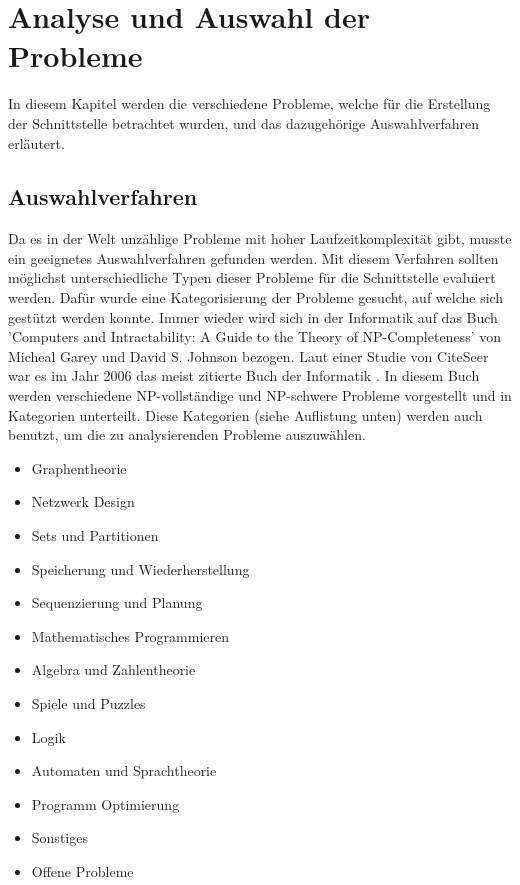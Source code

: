%
%

\chapter{Analyse und Auswahl der Probleme \resultAssignment{[R1]}}\label{chap.problemauswahl}
In diesem Kapitel werden die verschiedene Probleme, welche für die Erstellung der Schnittstelle betrachtet wurden, und das dazugehörige Auswahlverfahren erläutert.

\section{Auswahlverfahren}\label{cat_theo_inf}
Da es in der Welt unzählige Probleme mit hoher Laufzeitkomplexität gibt, musste ein geeignetes Auswahlverfahren gefunden werden. Mit diesem Verfahren sollten möglichst unterschiedliche 
Typen dieser Probleme für die Schnittstelle evaluiert werden. Dafür wurde eine Kategorisierung der Probleme gesucht, auf welche sich gestützt werden konnte. Immer wieder wird sich in der 
Informatik auf das Buch 'Computers and Intractability: A Guide to the Theory of NP-Completeness' \cite{garey1979computers} von Micheal Garey und David S. Johnson bezogen. Laut einer 
Studie von CiteSeer war es im Jahr 2006 das meist zitierte Buch der Informatik \cite{citeseer_algo_buch}. In diesem Buch werden verschiedene NP-vollständige und NP-schwere 
Probleme vorgestellt und in Kategorien unterteilt. Diese Kategorien (siehe Auflistung unten) werden auch benutzt, um die zu analysierenden Probleme auszuwählen.

\begin{itemize}
	\item Graphentheorie
	\item Netzwerk Design
	\item Sets und Partitionen
	\item Speicherung und Wiederherstellung
	\item Sequenzierung und Planung
	\item Mathematisches Programmieren
	\item Algebra und Zahlentheorie
	\item Spiele und Puzzles
	\item Logik
	\item Automaten und Sprachtheorie
	\item Programm Optimierung
	\item Sonstiges
	\item Offene Probleme
\end{itemize}

